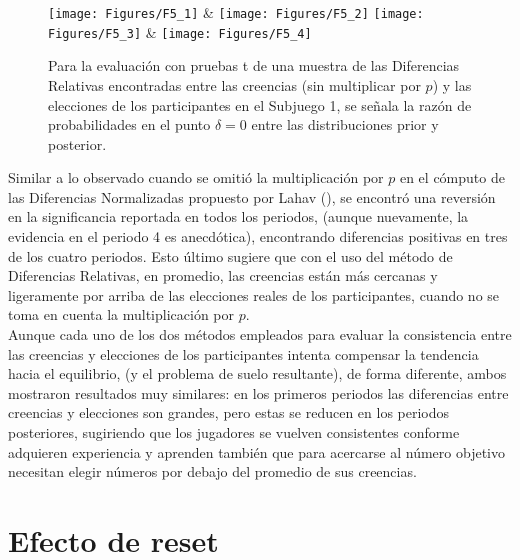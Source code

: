 \begin{figure}[h]
\centering
\texttt{[image: Figures/F5\_1]} & \texttt{[image: Figures/F5\_2]} 
\texttt{[image: Figures/F5\_3]} & \texttt{[image: Figures/F5\_4]} 
\decoRule
\caption[Diferencias Relativas entre creencias y elecciones en el Subjuego 1 sin la multiplicación por p (Factor de Bayes)]{Para la evaluación con pruebas t de una muestra de las Diferencias Relativas encontradas entre las creencias (sin multiplicar por $p$) y las elecciones de los participantes en el Subjuego 1, se señala la razón de probabilidades en el punto $\delta = 0$ entre las distribuciones prior y posterior.}
\label{fig:DRnop_S1}
\end{figure}


Similar a lo observado cuando se omitió la multiplicación por $p$ en el cómputo de las Diferencias Normalizadas propuesto por Lahav (\citeyear{Lahav}), se encontró una reversión en la significancia reportada en todos los periodos, (aunque nuevamente, la evidencia en el periodo 4 es anecdótica), encontrando diferencias positivas en tres de los cuatro periodos. Esto último sugiere que con el uso del método de Diferencias Relativas, en promedio, las creencias están más cercanas y ligeramente por arriba de las elecciones reales de los participantes, cuando no se toma en cuenta la multiplicación por $p$.\\

Aunque cada uno de los dos métodos empleados para evaluar la consistencia entre las creencias y elecciones de los participantes intenta compensar la tendencia hacia el equilibrio, (y el problema de suelo resultante), de forma diferente, ambos mostraron resultados muy similares: en los primeros periodos las diferencias entre creencias y elecciones son grandes, pero estas se reducen en los periodos posteriores, sugiriendo que los jugadores se vuelven consistentes conforme adquieren experiencia y aprenden también que para acercarse al número objetivo necesitan elegir números por debajo del promedio de sus creencias.

\section{Efecto de reset}\\

